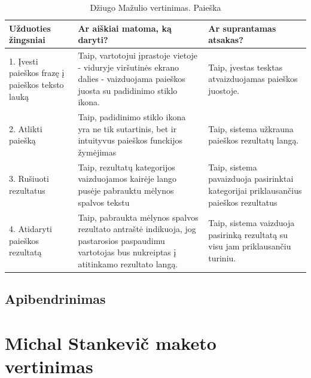 \documentclass[oneside]{VUMIFPSkursinis}
\begin{document}
\begin{center}
\begin{longtable}[!htb]{|p{5cm}|p{5cm}|p{5cm}|}
	\caption{Džiugo Mažulio vertinimas. Paieška}
\endfirsthead
\endhead
	\hline
	Užduoties žingsniai & Ar aiškiai matoma, ką daryti? & Ar suprantamas atsakas? \\ \hline
	1. Įvesti paieškos frazę į paieškos teksto lauką & Taip, vartotojui įprastoje vietoje - viduryje viršutinės ekrano dalies - vaizduojama paieškos juosta su padidinimo stiklo ikona. & Taip, įvestas tesktas atvaizduojamas paieškos juostoje.   \\ \hline
	2. Atlikti paiešką & Taip, padidinimo stiklo ikona yra ne tik sutartinis, bet ir intuityvus paieškos funckijos žymėjimas & Taip, sistema užkrauna paieškos rezultatų langą. \\ \hline
	3. Rušiuoti rezultatus & Taip, rezultatų kategorijos vaizduojamos kairėje lango pusėje pabrauktu mėlynos spalvos tekstu & Taip, sistema pavaizduoja pasirinktai kategorijai priklausančius paieškos rezultatus \\ \hline
	4. Atidaryti paieškos rezultatą & Taip, pabraukta mėlynos spalvos rezultato antraštė indikuoja, jog pastarosios paspaudimu vartotojas bus nukreiptas į atitinkamo rezultato langą. & Taip, sistema vaizduoja pasirinką rezultatą su visu jam priklausančiu turiniu. \\ \hline
\end{longtable}
\end{center}
\subsection{Apibendrinimas}

\section{Michal Stankevič maketo vertinimas}
\end{document}
